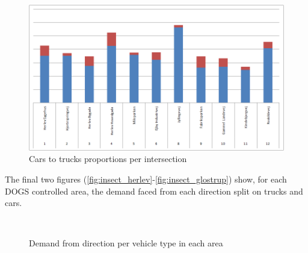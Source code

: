 \begin{figure}[htbp]
\centering
\includegraphics[scale=0.40]{cars_vs_trucks_all_intersections.png}
\caption{Cars to trucks proportions per intersection}
\label{fig:cars2trucks_insect}
\end{figure}

The final two figures (\ref{fig:insect_herlev}-\ref{fig:insect_glostrup}) show, for each DOGS controlled area, the demand faced from each direction split on trucks and cars. 

\begin{figure}[htbp]
\centering
{} \\
    
\caption{Demand from direction per vehicle type in each area}
\end{figure}

